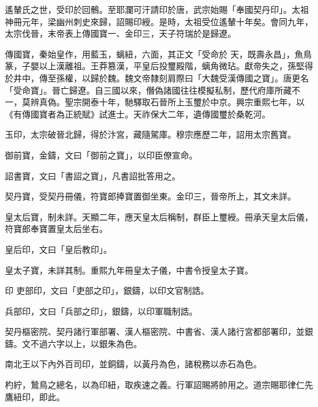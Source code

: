 
\begin{pinyinscope}

 遙輦氏之世，受印於回鶻。至耶瀾可汗請印於唐，武宗始賜「奉國契丹印」。太祖神冊元年，梁幽州刺史來歸，詔賜印綬。是時，太祖受位遙輦十年矣。會同九年，太宗伐晉，末帝表上傳國寶一、金印三，天子符瑞於是歸遼。



 傳國寶，秦始皇作，用藍玉，螭紐，六面，其正文「受命於
 天，既壽永昌」，魚鳥篆，子嬰以上漢離祖。王莽篡漢，平皇后投璽殿階，螭角微玷。獻帝失之，孫堅得於井中，傳至孫權，以歸於魏。魏文帝隸刻肩際曰「大魏受漢傳國之寶」。唐更名「受命寶」。晉亡歸遼。自三國以來，僭偽諸國往往模擬私制，歷代府庫所藏不一，莫辨真偽。聖宗開泰十年，馳驛取石晉所上玉璽於中京。興宗重熙七年，以《有傳國寶者為正統賦》試進士。天祚保大二年，遺傳國璽於桑乾河。



 玉印，太宗破晉北歸，得於汴宮，藏隨駕庫。穆宗應歷二年，詔用太宗舊寶。



 御前寶，金鑄，文曰「御前之寶」，以印臣僚宣命。



 詔書寶，文曰「書詔之寶」，凡書詔批答用之。



 契丹寶，受契丹冊儀，符寶郎捧寶置御坐東。金印三，晉帝所上，其文未詳。



 皇太后寶，制未詳。天顯二年，應天皇太后稱制，群臣上璽綬。冊承天皇太后儀，符寶郎奉寶置皇太后坐右。



 皇后印，文曰「皇后教印」。



 皇太子寶，未詳其制。重熙九年冊皇太子儀，中書令授皇太子寶。



 印
 吏部印，文曰「吏部之印」，銀鑄，以印文官制誥。



 兵部印，文曰「兵部之印」，銀鑄，以印軍職制誥。



 契丹樞密院、契丹諸行軍部署、漢人樞密院、中書省、漢人諸行宮都部署印，並銀鑄。文不過六字以上，以銀朱為色。



 南北王以下內外百司印，並銅鑄，以黃丹為色，諸稅務以赤石為色。



 杓紵，鷙鳥之總名，以為印紐，取疾速之義。行軍詔賜將帥用之。道宗賜耶律仁先鷹紐印，即此。




\end{pinyinscope}

